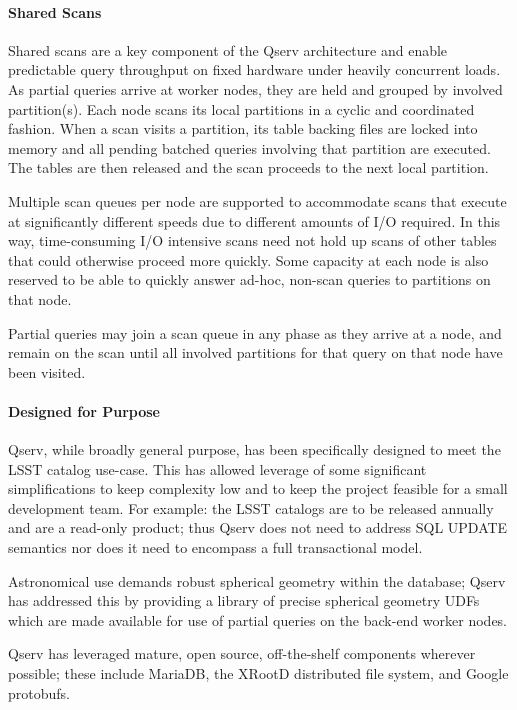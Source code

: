 \documentclass[11pt,twoside]{article}
\begin{document}
\paragraph{Shared Scans}

Shared scans are a key component of the Qserv architecture and enable predictable query throughput on fixed
hardware under heavily concurrent loads.  As partial queries arrive at worker nodes, they are held and grouped
by involved partition(s).  Each node scans its local partitions in a cyclic and coordinated fashion. When a
scan visits a partition, its table backing files are locked into memory and all pending batched queries
involving that partition are executed.  The tables are then released and the scan proceeds to the next local
partition.

Multiple scan queues per node are supported to accommodate scans that execute at significantly different
speeds due to different amounts of I/O required.  In this way, time-consuming I/O intensive scans need not
hold up scans of other tables that could otherwise proceed more quickly.  Some capacity at each node is also
reserved to be able to quickly answer ad-hoc, non-scan queries to partitions on that node.

Partial queries may join a scan queue in any phase as they arrive at a node, and remain on the scan until all
involved partitions for that query on that node have been visited.

\paragraph{Designed for Purpose}

Qserv, while broadly general purpose, has been specifically designed to meet the LSST catalog use-case. This
has allowed leverage of some significant simplifications to keep complexity low and to keep the project
feasible for a small development team.  For example: the LSST catalogs are to be released annually and are a
read-only product; thus Qserv does not need to address SQL UPDATE semantics nor does it need to encompass a
full transactional model.

Astronomical use demands robust spherical geometry within the database; Qserv has addressed this by providing
a library of precise spherical geometry UDFs which are made available for use of partial queries on the
back-end worker nodes.

Qserv has leveraged mature, open source, off-the-shelf components wherever possible; these include MariaDB,
the XRootD distributed file system, and Google protobufs.
\end{document}
